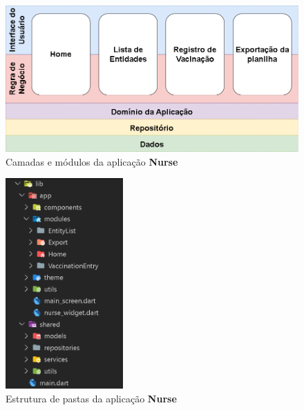\begin{figure}[!ht]
  \centering
  \includegraphics[width=\textwidth]{figuras/cap4/3_2_2_modulos_camadas_nurse.png}
  \caption{Camadas e módulos da aplicação \textbf{Nurse}}
  \label{fig:3_2_2_modulos_camadas_nurse}
\end{figure}

\begin{figure}[!ht]
  \centering
  \includegraphics[width=0.4\textwidth]{figuras/cap4/3_2_2_pastas_nurse.png}
  \caption{Estrutura de pastas da aplicação \textbf{Nurse}}
  \label{fig:3_2_2_pastas_nurse}
\end{figure}

